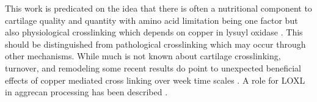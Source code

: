 {{}

This work is predicated on the idea  that 
there is  often  a nutritional component 
to cartilage quality and quantity 
with amino acid limitation being one factor but also
physiological crosslinking which depends on copper
in lysuyl oxidase \cite{PMC7204390}.
This should be distinguished from pathological crosslinking
which may occur through other mechanisms. 
While much is not known about cartilage crosslinking,
turnover, and remodeling some recent results do point
to unexpected beneficial effects of copper mediated
cross linking over week time scales \cite{PMID25907046}.
A role for LOXL in aggrecan processing has been described
\cite{Tashkandi_Alsaqer_Alhousami_LOXL2_promotes_aggrecan_2020}.



} %

